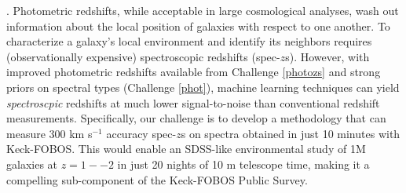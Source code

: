 \documentclass[oneside,11pt]{amsart}
\newcounter{chalno}
\newcommand{\chal}[1]{\refstepcounter{chalno}\label{#1}}
\begin{document}
\medskip
\chal{lowsnr}
.  Photometric redshifts, while acceptable
in large cosmological analyses, wash out information about the local position of galaxies with respect to one another.
To characterize a galaxy's local environment and identify its neighbors requires (observationally expensive)
spectroscopic redshifts (spec-$z$s).  However, with improved photometric redshifts available from Challenge
\ref{photozs} and strong priors on spectral types (Challenge \ref{phot}), machine learning techniques can yield
\emph{spectroscpic} redshifts at much lower signal-to-noise than conventional redshift measurements. Specifically, our
challenge is to develop a methodology that can measure 300 km s$^{-1}$ accuracy spec-$z$s on spectra obtained in just
10 minutes with Keck-FOBOS.  This would enable an SDSS-like environmental study of 1M galaxies at $z=1--2$ in just 20
nights of 10 m telescope time, making it a compelling sub-component of the Keck-FOBOS Public Survey.








\end{document}
